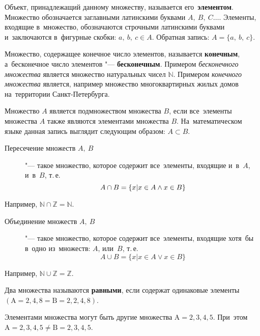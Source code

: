 \documentclass[]{scrartcl}
\begin{document}
{{Объект, принадлежащий данному множеству, называется его~\textbf{элементом}. Множество обозначается заглавными латинскими буквами ${\textstyle{A},\ B,\ C\ldots}$. Элементы, входящие в~множество, обозначаются строчными латинскими буквами и~заключаются в~фигурные скобки: ${\textstyle a,\ b,\ c \in A}$. Обратная запись: ${\textstyle A=\{a,\ b,\ c\}}$.

Множество, содержащее конечное число элементов, называется \textbf{конечным}, а~бесконечное число элементов "--- \textbf{бесконечным}. Примером \emph{бесконечного множества} является множество натуральных чисел ${\textstyle \mathbb{N}}$. Примером \emph{конечного множества} является, например множество многоквартирных жилых домов на~территории Санкт-Петербурга.

Множество ${\textstyle A}$ является подмножеством множества ${\textstyle B}$, если все~элементы множества ${\textstyle A}$ также являются элементами множества ${\textstyle B}$. На~математическом языке данная запись выглядит следующим образом: ${\textstyle A\subset B}$.

\begin{description}
	\item[Пересечение множеств ${\textstyle A,\ B}$] "--- такое множество, которое содержит все~элементы, входящие и~в~${\textstyle A}$, и~в~${\textstyle B}$, т.\,е.
	\begin{equation}\label{eq:sets-intercept}
	A\cap B = \{x\arrowvert x \in A \wedge x \in B\}
	\end{equation}
\end{description}
Например, ${\textstyle \mathbb{N} \cap \mathbb{Z} = \mathbb{N}}$.
\begin{description}
	\item[Объединение множеств ${\textstyle A,\ B}$] "--- такое множество, которое содержит все~элементы, входящие хотя~бы в~одно из~множеств: ${\textstyle A}$, или~${\textstyle B}$, т.\,е.
	\begin{equation}\label{eq:sets-join}
	A\cup B = \{x|x \in A \vee x \in B\}
	\end{equation}
\end{description}
Например, ${\textstyle \mathbb{N} \cup \mathbb{Z} = \mathbb{Z}}$.

Два множества называются \textbf{равными}, если содержат одинаковые элементы ${(\text{A}={2,4,8}=\text{B}={2,2,4,8})}$.

Элементами множества могут быть другие множества ${\text{A}={{2,3},{4,5}}}$. При~этом ${\text{A}={{2,3},{4,5}}\neq \text{B}= {2,3,4,5}}$.

}}
\end{document}
